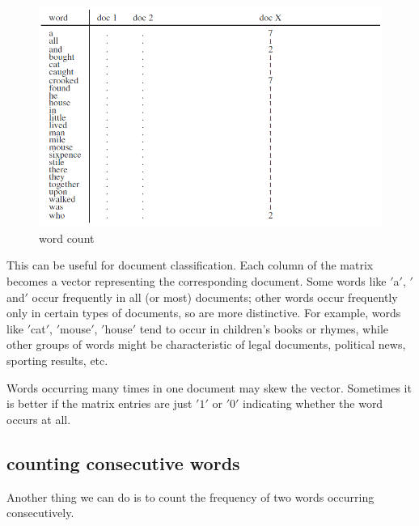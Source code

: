 \documentclass[11pt]{article}
\begin{document}
\begin{figure}[H]
    \centering
    \includegraphics{../out/images/word-count}
    \caption[word count]{word count}
    \label{fig:word count}
\end{figure}

This can be useful for document classification.
Each column of the matrix becomes a vector representing the corresponding
document.
Some words like \('\)a\('\), \('\)and\('\) occur frequently in all (or most)
documents;
other words occur frequently only in certain types of documents, so are more
distinctive.
For example, words like \('\)cat\('\), \('\)mouse\('\), \('\)house\('\) tend
to occur in children’s books or rhymes, while other groups of words might be
characteristic of legal documents, political news, sporting results, etc.

Words occurring many times in one document may skew the vector.
Sometimes it is better if the matrix entries are just \('1'\) or \('0'\)
indicating whether the word occurs at all.

\subsection{counting consecutive words}\label{subsec:counting-consecutive-words}
Another thing we can do is to count the frequency of two words occurring
consecutively.
\end{document}
